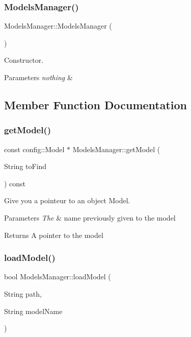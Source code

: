 \subsubsection{\texorpdfstring{Models\+Manager()}{ModelsManager()}}
{\footnotesize\ttfamily Models\+Manager\+::\+Models\+Manager (\begin{DoxyParamCaption}{ }\end{DoxyParamCaption})}



Constructor. 


\begin{DoxyParams}{Parameters}
{\em nothing} & \\
\hline
\end{DoxyParams}


\subsection{Member Function Documentation}
\mbox{\label{classModelsManager_aecbaab73572634a9e5cbc035b25864e1}} 
\subsubsection{\texorpdfstring{get\+Model()}{getModel()}}
{\footnotesize\ttfamily const config\+::\+Model $\ast$ Models\+Manager\+::get\+Model (\begin{DoxyParamCaption}\item[{String}]{to\+Find }\end{DoxyParamCaption}) const}



Give you a pointeur to an object Model. 


\begin{DoxyParams}{Parameters}
{\em The} & name previously given to the model \\
\hline
\end{DoxyParams}
\begin{DoxyReturn}{Returns}
A pointer to the model 
\end{DoxyReturn}
\mbox{\label{classModelsManager_a68352308cd93cb509b7266b0cf1bb5f3}} 
\subsubsection{\texorpdfstring{load\+Model()}{loadModel()}}
{\footnotesize\ttfamily bool Models\+Manager\+::load\+Model (\begin{DoxyParamCaption}\item[{String}]{path,  }\item[{String}]{model\+Name }\end{DoxyParamCaption})}



